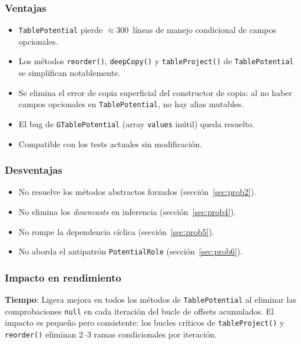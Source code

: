 \documentclass[11pt,a4paper]{article}
\newcommand{\code}[1]{\texttt{#1}}
\begin{document}
\subsubsection*{Ventajas}

\begin{itemize}
  \item \code{TablePotential} pierde $\approx$300~líneas de manejo condicional
        de campos opcionales.
  \item Los métodos \code{reorder()}, \code{deepCopy()} y \code{tableProject()}
        de \code{TablePotential} se simplifican notablemente.
  \item Se elimina el error de copia superficial del constructor de copia: al no
        haber campos opcionales en \code{TablePotential}, no hay alias mutables.
  \item El bug de \code{GTablePotential} (array \code{values} inútil) queda
        resuelto.
  \item Compatible con los tests actuales sin modificación.
\end{itemize}

\subsubsection*{Desventajas}

\begin{itemize}
  \item No resuelve los métodos abstractos forzados (sección~\ref{sec:prob2}).
  \item No elimina los \emph{downcasts} en inferencia (sección~\ref{sec:prob4}).
  \item No rompe la dependencia cíclica (sección~\ref{sec:prob5}).
  \item No aborda el antipatrón \code{PotentialRole} (sección~\ref{sec:prob6}).
\end{itemize}

\subsubsection*{Impacto en rendimiento}

\textbf{Tiempo}: Ligera mejora en todos los métodos de \code{TablePotential} al
eliminar las comprobaciones \code{null} en cada iteración del bucle de offsets
acumulados.  El impacto es pequeño pero consistente: los bucles críticos de
\code{tableProject()} y \code{reorder()} eliminan 2--3 ramas condicionales por
iteración.
\end{document}
